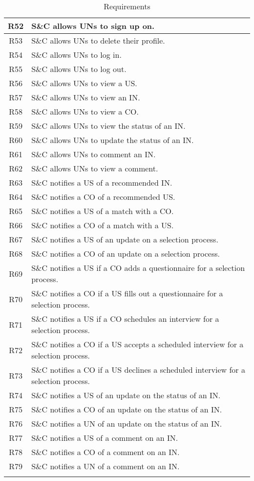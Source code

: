 \begin{longtable}{|c|p{10.5cm}|}
    R52 & S\&C allows UNs to sign up on. \\ \hline
    R53 & S\&C allows UNs to delete their profile. \\ \hline
    R54 & S\&C allows UNs to log in. \\ \hline
    R55 & S\&C allows UNs to log out. \\ \hline
    R56 & S\&C allows UNs to view a US. \\ \hline
    R57 & S\&C allows UNs to view an IN. \\ \hline
    R58 & S\&C allows UNs to view a CO. \\ \hline
    R59 & S\&C allows UNs to view the status of an IN. \\ \hline
    R60 & S\&C allows UNs to update the status of an IN. \\ \hline
    R61 & S\&C allows UNs to comment an IN. \\ \hline
    R62 & S\&C allows UNs to view a comment. \\ \hline
    
    R63 & S\&C notifies a US of a recommended IN. \\ \hline
    R64 & S\&C notifies a CO of a recommended US. \\ \hline
    R65 & S\&C notifies a US of a match with a CO. \\ \hline
    R66 & S\&C notifies a CO of a match with a US. \\ \hline
    R67 & S\&C notifies a US of an update on a selection process. \\ \hline
    R68 & S\&C notifies a CO of an update on a selection process. \\ \hline
    R69 & S\&C notifies a US if a CO adds a questionnaire for a selection process. \\ \hline
    R70 & S\&C notifies a CO if a US fills out a questionnaire for a selection process. \\ \hline
    R71 & S\&C notifies a US if a CO schedules an interview for a selection process. \\ \hline
    R72 & S\&C notifies a CO if a US accepts a scheduled interview for a selection process. \\ \hline
    R73 & S\&C notifies a CO if a US declines a scheduled interview for a selection process. \\ \hline
    R74 & S\&C notifies a US of an update on the status of an IN. \\ \hline
    R75 & S\&C notifies a CO of an update on the status of an IN. \\ \hline
    R76 & S\&C notifies a UN of an update on the status of an IN. \\ \hline
    R77 & S\&C notifies a US of a comment on an IN. \\ \hline
    R78 & S\&C notifies a CO of a comment on an IN. \\ \hline
    R79 & S\&C notifies a UN of a comment on an IN. \\ \hline
\caption{Requirements}
\end{longtable}

